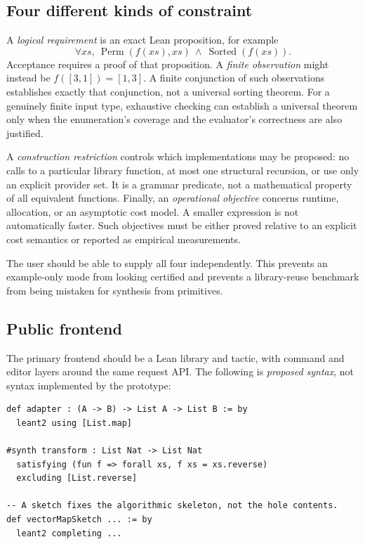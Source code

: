 \subsection{Four different kinds of constraint}

A \emph{logical requirement} is an exact Lean proposition, for example
\[
 \forall xs,\ \operatorname{Perm}(f(xs),xs)\ \land\ \operatorname{Sorted}(f(xs)).
\]
Acceptance requires a proof of that proposition. A \emph{finite observation} might instead be $f([3,1])=[1,3]$. A finite conjunction of such observations establishes exactly that conjunction, not a universal sorting theorem. For a genuinely finite input type, exhaustive checking can establish a universal theorem only when the enumeration's coverage and the evaluator's correctness are also justified.

A \emph{construction restriction} controls which implementations may be proposed: no calls to a particular library function, at most one structural recursion, or use only an explicit provider set. It is a grammar predicate, not a mathematical property of all equivalent functions. Finally, an \emph{operational objective} concerns runtime, allocation, or an asymptotic cost model. A smaller expression is not automatically faster. Such objectives must be either proved relative to an explicit cost semantics or reported as empirical measurements.

The user should be able to supply all four independently. This prevents an example-only mode from looking certified and prevents a library-reuse benchmark from being mistaken for synthesis from primitives.

\subsection{Public frontend}

The primary frontend should be a Lean library and tactic, with command and editor layers around the same request API. The following is \emph{proposed syntax}, not syntax implemented by the prototype:
\par\noindent\begin{minipage}{\linewidth}
\begin{lstlisting}
def adapter : (A -> B) -> List A -> List B := by
  leant2 using [List.map]

#synth transform : List Nat -> List Nat
  satisfying (fun f => forall xs, f xs = xs.reverse)
  excluding [List.reverse]

-- A sketch fixes the algorithmic skeleton, not the hole contents.
def vectorMapSketch ... := by
  leant2 completing ...
\end{lstlisting}
\end{minipage}\par

